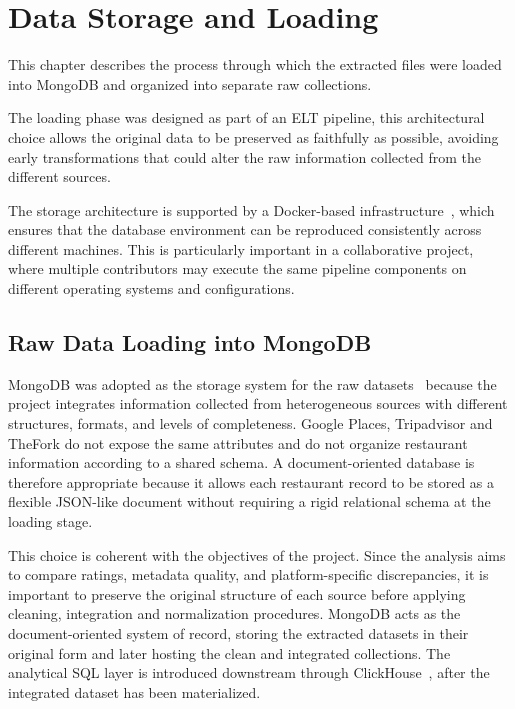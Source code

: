 \chapter{Data Storage and Loading}

This chapter describes the process through which the extracted files were loaded into MongoDB and organized into separate raw collections.

The loading phase was designed as part of an ELT pipeline, this architectural choice allows the original data to be preserved as faithfully as possible, avoiding early transformations that could alter the raw information collected from the different sources.

The storage architecture is supported by a Docker-based infrastructure~\cite{docker}, which ensures that the database environment can be reproduced consistently across different machines. This is particularly important in a collaborative project, where multiple contributors may execute the same pipeline components on different operating systems and configurations.

\section{Raw Data Loading into MongoDB}

MongoDB was adopted as the storage system for the raw datasets~\cite{mongodb} because the project integrates information collected from heterogeneous sources with different structures, formats, and levels of completeness. Google Places, Tripadvisor and TheFork do not expose the same attributes and do not organize restaurant information according to a shared schema. A document-oriented database is therefore appropriate because it allows each restaurant record to be stored as a flexible JSON-like document without requiring a rigid relational schema at the loading stage.

This choice is coherent with the objectives of the project. Since the analysis aims to compare ratings, metadata quality, and platform-specific discrepancies, it is important to preserve the original structure of each source before applying cleaning, integration and normalization procedures. MongoDB acts as the document-oriented system of record, storing the extracted datasets in their original form and later hosting the clean and integrated collections. The analytical SQL layer is introduced downstream through ClickHouse~\cite{clickhouse}, after the integrated dataset has been materialized.

